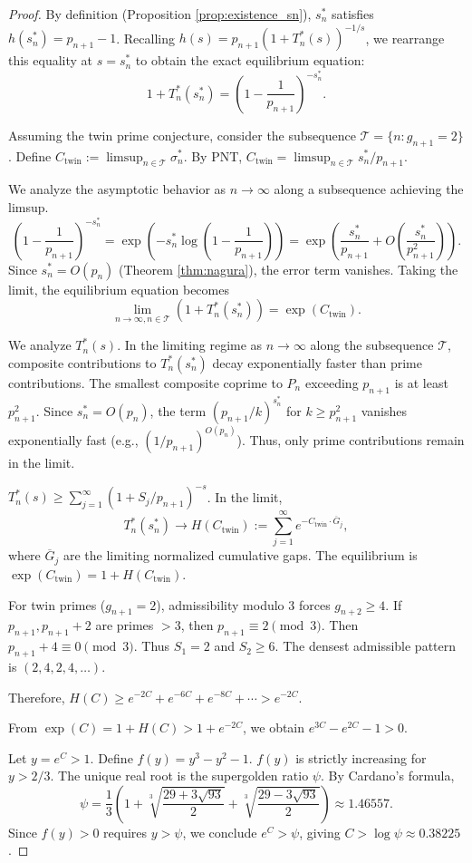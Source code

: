 \documentclass[12pt]{article}
\theoremstyle{plain}
\theoremstyle{definition}
\theoremstyle{remark}
\begin{document}
\begin{proof}
By definition (Proposition \ref{prop:existence_sn}), $s_n^*$ satisfies $h(s_n^*) = p_{n+1} - 1$. Recalling $h(s) = p_{n+1}(1 + T_n^*(s))^{-1/s}$, we rearrange this equality at $s=s_n^*$ to obtain the exact equilibrium equation:
\[
1 + T_n^*(s_n^*) = \left(1 - \frac{1}{p_{n+1}}\right)^{-s_n^*}.
\]

Assuming the twin prime conjecture, consider the subsequence $\mathcal{T} = \{n : g_{n+1} = 2\}$. Define $C_{\text{twin}} := \limsup_{n \in \mathcal{T}} \sigma_n^*$. By PNT, $C_{\text{twin}} = \limsup_{n \in \mathcal{T}} s_n^*/p_{n+1}$.

We analyze the asymptotic behavior as $n \to \infty$ along a subsequence achieving the limsup.
\[
\left(1 - \frac{1}{p_{n+1}}\right)^{-s_n^*} = \exp\left(-s_n^* \log\left(1 - \frac{1}{p_{n+1}}\right)\right) = \exp\left(\frac{s_n^*}{p_{n+1}} + O\left(\frac{s_n^*}{p_{n+1}^2}\right)\right).
\]
Since $s_n^* = O(p_n)$ (Theorem \ref{thm:nagura}), the error term vanishes. Taking the limit, the equilibrium equation becomes
\[
\lim_{n\to\infty, n\in\mathcal{T}} (1 + T_n^*(s_n^*)) = \exp(C_{\text{twin}}).
\]

We analyze $T_n^*(s)$. In the limiting regime as $n \to \infty$ along the subsequence $\mathcal{T}$, composite contributions to $T_n^*(s_n^*)$ decay exponentially faster than prime contributions. The smallest composite coprime to $P_n$ exceeding $p_{n+1}$ is at least $p_{n+1}^2$. Since $s_n^* = O(p_n)$, the term $(p_{n+1}/k)^{s_n^*}$ for $k \geq p_{n+1}^2$ vanishes exponentially fast (e.g., $(1/p_{n+1})^{O(p_n)}$). Thus, only prime contributions remain in the limit.

$T_n^*(s) \geq \sum_{j=1}^{\infty} (1 + S_j/p_{n+1})^{-s}$. In the limit,
\[
T_n^*(s_n^*) \to H(C_{\text{twin}}) := \sum_{j=1}^{\infty} e^{-C_{\text{twin}} \cdot \overline{G}_j},
\]
where $\overline{G}_j$ are the limiting normalized cumulative gaps. The equilibrium is $\exp(C_{\text{twin}}) = 1 + H(C_{\text{twin}})$.

For twin primes ($g_{n+1} = 2$), admissibility modulo 3 forces $g_{n+2} \geq 4$. If $p_{n+1}, p_{n+1}+2$ are primes $>3$, then $p_{n+1} \equiv 2 \pmod 3$. Then $p_{n+1}+4 \equiv 0 \pmod 3$. Thus $S_1 = 2$ and $S_2 \geq 6$. The densest admissible pattern is $(2, 4, 2, 4, \ldots)$.

Therefore, $H(C) \geq e^{-2C} + e^{-6C} + e^{-8C} + \cdots > e^{-2C}$.

From $\exp(C) = 1 + H(C) > 1 + e^{-2C}$, we obtain $e^{3C} - e^{2C} - 1 > 0$.

Let $y = e^C > 1$. Define $f(y) = y^3 - y^2 - 1$. $f(y)$ is strictly increasing for $y > 2/3$. The unique real root is the supergolden ratio $\psi$. By Cardano's formula,
\[
\psi = \frac{1}{3}\left(1 + \sqrt[3]{\frac{29+3\sqrt{93}}{2}} + \sqrt[3]{\frac{29-3\sqrt{93}}{2}}\right) \approx 1.46557.
\]
Since $f(y) > 0$ requires $y > \psi$, we conclude $e^C > \psi$, giving $C > \log \psi \approx 0.38225$.
\end{proof}
\end{document}
